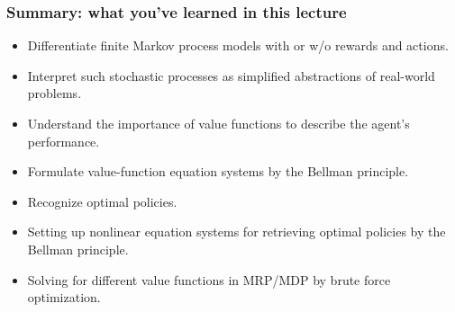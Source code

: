 
\begin{frame}
  \frametitle{Summary: what you've learned in this lecture}
  \begin{itemize}
  \item Differentiate finite Markov process models with or w/o rewards and actions.\pause
  \item Interpret such stochastic processes as simplified abstractions of real-world problems.\pause
  \item Understand the importance of value functions to describe the agent's performance. \pause
  \item Formulate value-function equation systems by the Bellman principle.\pause
  \item Recognize optimal policies.\pause
  \item Setting up nonlinear equation systems for retrieving optimal policies by the Bellman principle.\pause
  \item Solving for different value functions in MRP/MDP by brute force optimization.
  \end{itemize}
\end{frame}
